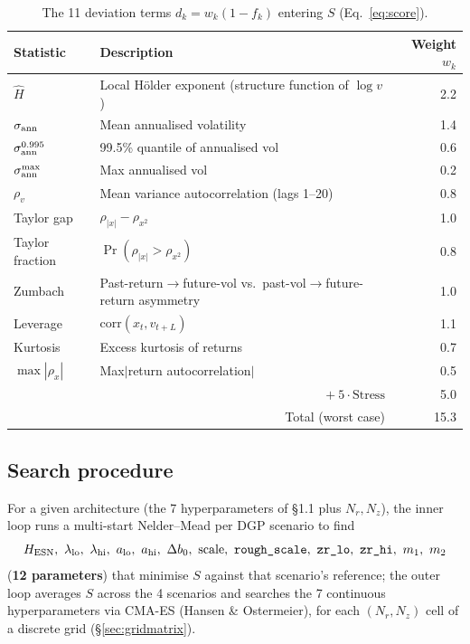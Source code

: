 \documentclass[11pt,a4paper]{article}
\begin{document}
\begin{table}[h]
\centering
\caption{The 11 deviation terms $d_k=w_k(1-f_k)$ entering $S$ (Eq.~\eqref{eq:score}).}
\label{tab:scoreterms}
\begin{tabular}{@{}lp{7.2cm}r@{}}
\toprule
Statistic & Description & Weight $w_k$ \\
\midrule
$\hat H$ & Local H\"older exponent (structure function of $\log v$) & 2.2 \\
$\sigma_{\rm ann}$ & Mean annualised volatility & 1.4 \\
$\sigma^{0.995}_{\rm ann}$ & 99.5\% quantile of annualised vol & 0.6 \\
$\sigma^{\max}_{\rm ann}$ & Max annualised vol & 0.2 \\
$\rho_v$ & Mean variance autocorrelation (lags 1--20) & 0.8 \\
Taylor gap & $\rho_{|x|}-\rho_{x^2}$ & 1.0 \\
Taylor fraction & $\Pr(\rho_{|x|}>\rho_{x^2})$ & 0.8 \\
Zumbach & Past-return$\to$future-vol vs.\ past-vol$\to$future-return asymmetry & 1.0 \\
Leverage & $\mathrm{corr}(x_t,v_{t+L})$ & 1.1 \\
Kurtosis & Excess kurtosis of returns & 0.7 \\
$\max|\rho_x|$ & Max$|$return autocorrelation$|$ & 0.5 \\
\midrule
\multicolumn{2}{r}{$+\ 5\cdot\mathrm{Stress}$} & 5.0 \\
\midrule
\multicolumn{2}{r}{Total (worst case)} & 15.3 \\
\bottomrule
\end{tabular}
\end{table}

\subsection{Search procedure}

For a given architecture (the 7 hyperparameters of \S1.1 plus
$N_r,N_z$), the inner loop runs a multi-start Nelder--Mead per DGP
scenario to find
\[
H_{\rm ESN},\ \lambda_{\rm lo},\ \lambda_{\rm hi},\ a_{\rm lo},\ a_{\rm hi},\
\Delta b_0,\ \mathrm{scale},\ \texttt{rough\_scale},\
\texttt{zr\_lo},\ \texttt{zr\_hi},\ m_1,\ m_2
\]
(\textbf{12 parameters}) that minimise $S$ against that scenario's
reference; the outer loop averages $S$ across the 4 scenarios and
searches the 7 continuous hyperparameters via CMA-ES (Hansen \&
Ostermeier), for each $(N_r,N_z)$ cell of a discrete grid
(\S\ref{sec:gridmatrix}).
\end{document}
